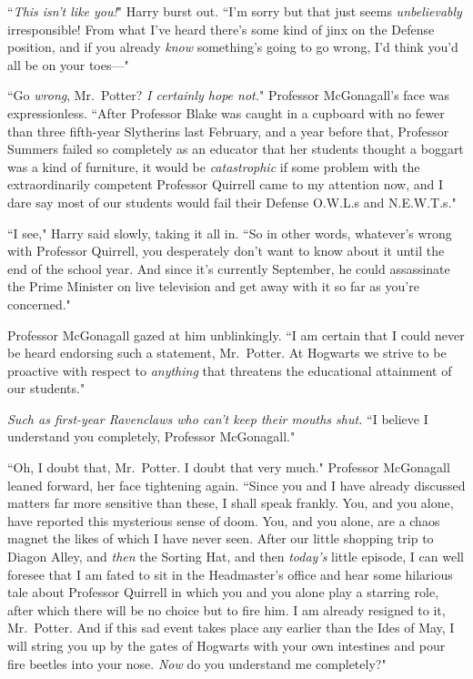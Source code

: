 ``\emph{This isn't like you!}" Harry burst out. ``I'm sorry but that just seems \emph{unbelievably} irresponsible! From what I've heard there's some kind of jinx on the Defense position, and if you already \emph{know} something's going to go wrong, I'd think you'd all be on your toes—"

``Go \emph{wrong}, Mr.~Potter? \emph{I certainly hope not.}" Professor McGonagall's face was expressionless. ``After Professor Blake was caught in a cupboard with no fewer than three fifth-year Slytherins last February, and a year before that, Professor Summers failed so completely as an educator that her students thought a boggart was a kind of furniture, it would be \emph{catastrophic} if some problem with the extraordinarily competent Professor Quirrell came to my attention now, and I dare say most of our students would fail their Defense O.W.L.s and N.E.W.T.s."

``I see," Harry said slowly, taking it all in. ``So in other words, whatever's wrong with Professor Quirrell, you desperately don't want to know about it until the end of the school year. And since it's currently September, he could assassinate the Prime Minister on live television and get away with it so far as you're concerned."

Professor McGonagall gazed at him unblinkingly. ``I am certain that I could never be heard endorsing such a statement, Mr.~Potter. At Hogwarts we strive to be proactive with respect to \emph{anything} that threatens the educational attainment of our students."

\emph{Such as first-year Ravenclaws who can't keep their mouths shut.} ``I believe I understand you completely, Professor McGonagall."

``Oh, I doubt that, Mr.~Potter. I doubt that very much." Professor McGonagall leaned forward, her face tightening again. ``Since you and I have already discussed matters far more sensitive than these, I shall speak frankly. You, and you alone, have reported this mysterious sense of doom. You, and you alone, are a chaos magnet the likes of which I have never seen. After our little shopping trip to Diagon Alley, and \emph{then} the Sorting Hat, and then \emph{today's} little episode, I can well foresee that I am fated to sit in the Headmaster's office and hear some hilarious tale about Professor Quirrell in which you and you alone play a starring role, after which there will be no choice but to fire him. I am already resigned to it, Mr.~Potter. And if this sad event takes place any earlier than the Ides of May, I will string you up by the gates of Hogwarts with your own intestines and pour fire beetles into your nose. \emph{Now} do you understand me completely?"

